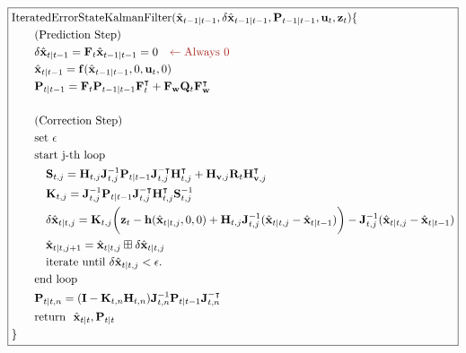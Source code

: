 \documentclass[10pt]{article}
\begin{document}
	\begin{equation} 
		\boxed{ \begin{aligned} 
				& \text{IteratedErrorStateKalmanFilter}(\hat{\mathbf{x}}_{t-1|t-1}, \delta \hat{\mathbf{x}}_{t-1|t-1}, \mathbf{P}_{t-1|t-1}, \mathbf{u}_{t}, \mathbf{z}_{t}) \{ \\ 
				& \quad\quad \text{(Prediction Step)}\\  
				& \quad\quad \delta \hat{\mathbf{x}}_{t|t-1} = \mathbf{F}_{t}\hat{\mathbf{x}}_{t-1|t-1}= 0 {\color{Mahogany} \quad \leftarrow \text{Always 0} } \\  
				& \quad\quad  \hat{\mathbf{x}}_{t|t-1} = \mathbf{f}(\hat{\mathbf{x}}_{t-1|t-1}, 0,\mathbf{u}_{t}, 0) \\ 
				& \quad\quad \mathbf{P}_{t|t-1} = \mathbf{F}_{t}\mathbf{P}_{t-1|t-1}\mathbf{F}_{t}^{\intercal} + \mathbf{F}_{\mathbf{w}}\mathbf{Q}_{t} \mathbf{F}_{\mathbf{w}}^{\intercal}\\  
				& \\  
				& \quad\quad \text{(Correction Step)} \\ 
				& \quad\quad \text{set } \epsilon \\
				& \quad\quad  \text{start j-th loop }  \\
				& \quad\quad \quad \mathbf{S}_{t,j} = \mathbf{H}_{t,j}\mathbf{J}^{-1}_{t,j} \mathbf{P}_{t|t-1} \mathbf{J}^{-\intercal}_{t,j}\mathbf{H}_{t,j}^{\intercal} + \mathbf{H}_{\mathbf{v},j}\mathbf{R}_{t}\mathbf{H}_{\mathbf{v},j}^{\intercal} \\ 
				&  \quad\quad \quad   \mathbf{K}_{t,j} = \mathbf{J}^{-1}_{t,j} \mathbf{P}_{t|t-1} \mathbf{J}^{-\intercal}_{t,j}\mathbf{H}_{t,j}^{\intercal}\mathbf{S}_{t,j}^{-1} \\
				& \quad\quad \quad \delta \hat{\mathbf{x}}_{t|t,j} = \mathbf{K}_{t,j} \bigg(  \mathbf{z}_{t} - \mathbf{h}(\hat{\mathbf{x}}_{t|t,j}, 0 ,0) + \mathbf{H}_{t,j}\mathbf{J}^{-1}_{t,j}(\hat{\mathbf{x}}_{t|t,j} - \hat{\mathbf{x}}_{t|t-1}) \bigg) - \mathbf{J}^{-1}_{t,j}(\hat{\mathbf{x}}_{t|t,j} - \hat{\mathbf{x}}_{t|t-1})\\
				& \quad\quad \quad \hat{\mathbf{x}}_{t|t, j+1}  = \hat{\mathbf{x}}_{t|t, j} \boxplus \delta \hat{\mathbf{x}}_{t|t,j} \\
				& \quad\quad \quad \text{iterate until } \delta \hat{\mathbf{x}}_{t|t,j} < \epsilon.   \\ 
				& \quad\quad \text{end loop} \\ 
				& \quad\quad     \mathbf{P}_{t|t,n}    = (\mathbf{I} - \mathbf{K}_{t,n}\mathbf{H}_{t,n}) \mathbf{J}^{-1}_{t,n}\mathbf{P}_{t|t-1} \mathbf{J}_{t,n}^{-\intercal} \\ 
				& \quad\quad \text{return} \ \ \hat{\mathbf{x}}_{t|t}, \mathbf{P}_{t|t} \\ 
				&   \} 
		\end{aligned} }
	\end{equation}
\end{document}
